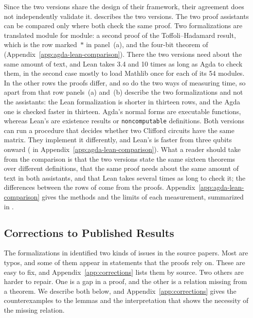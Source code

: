 \documentclass[acmsmall,screen,nonacm]{acmart}
\begin{document}
Since the two versions share the design of their framework, their agreement does not independently validate it.  describes the two versions. The two proof assistants can be compared only where both check the same proof. Two formalizations are translated module for module: a second proof of the Toffoli--Hadamard result, which is the row marked~$\ast$ in panel~(a), and the four-bit theorem of  (Appendix~\ref{app:agda-lean-comparison}). There the two versions need about the same amount of text, and Lean takes 3.4 and 10 times as long as Agda to check them, in the second case mostly to load Mathlib once for each of its 54 modules. In the other rows the proofs differ, and so do the two ways of measuring time, so apart from that row panels~(a) and~(b) describe the two formalizations and not the assistants: the Lean formalization is shorter in thirteen rows, and the Agda one is checked faster in thirteen. Agda's normal forms are executable functions, whereas Lean's are existence results or \texttt{noncomputable} definitions. Both versions can run a procedure that decides whether two Clifford circuits have the same matrix. They implement it differently, and Lean's is faster from three qubits onward ( in Appendix~\ref{app:agda-lean-comparison}). What a reader should take from the comparison is that the two versions state the same sixteen theorems over different definitions, that the same proof needs about the same amount of text in both assistants, and that Lean takes several times as long to check it; the differences between the rows of  come from the proofs. Appendix~\ref{app:agda-lean-comparison} gives the methods and the limits of each measurement, summarized in .

\fi

\subsection{Corrections to Published Results}\label{sec:findings}

The formalizations in  identified two kinds of issues in the source papers. Most are typos, and some of them appear in statements that the proofs rely on. These are easy to fix, and Appendix~\ref{app:corrections} lists them by source. Two others are harder to repair. One is a gap in a proof, and the other is a relation missing from a theorem. We describe both below, and Appendix~\ref{app:corrections} gives the counterexamples to the lemmas and the interpretation that shows the necessity of the missing relation.
\end{document}
